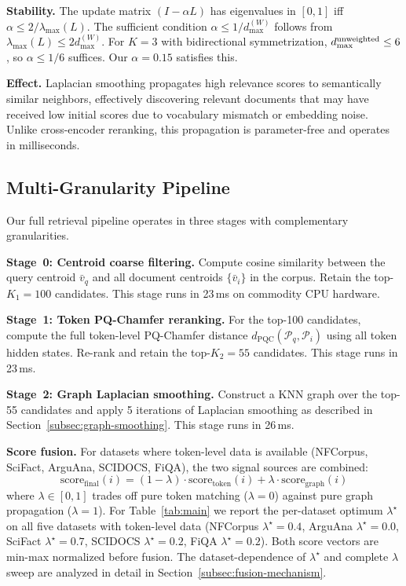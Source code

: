 \documentclass[review,1p]{elsarticle}
\newcommand{\bv}{\bar{v}}
\begin{document}
\textbf{Stability.} The update matrix $(I - \alpha L)$ has eigenvalues in $[0,1]$ iff $\alpha \le 2/\lambda_{\max}(L)$. The sufficient condition $\alpha \le 1/d_{\max}^{(W)}$ follows from $\lambda_{\max}(L) \le 2 d_{\max}^{(W)}$. For $K=3$ with bidirectional symmetrization, $d_{\max}^{\rm unweighted} \le 6$, so $\alpha \le 1/6$ suffices. Our $\alpha = 0.15$ satisfies this.

\textbf{Effect.} Laplacian smoothing propagates high relevance scores to semantically similar neighbors, effectively discovering relevant documents that may have received low initial scores due to vocabulary mismatch or embedding noise. Unlike cross-encoder reranking, this propagation is parameter-free and operates in milliseconds.

\subsection{Multi-Granularity Pipeline}
\label{subsec:pipeline}

Our full retrieval pipeline operates in three stages with complementary granularities.

\textbf{Stage~0: Centroid coarse filtering.} Compute cosine similarity between the query centroid $\bv_q$ and all document centroids $\{\bv_i\}$ in the corpus. Retain the top-$K_1 = 100$ candidates. This stage runs in 23\,ms on commodity CPU hardware.

\textbf{Stage~1: Token PQ-Chamfer reranking.} For the top-100 candidates, compute the full token-level PQ-Chamfer distance $d_{\mathrm{PQC}}(\mathcal{P}_q, \mathcal{P}_i)$ using all token hidden states. Re-rank and retain the top-$K_2 = 55$ candidates. This stage runs in 23\,ms.

\textbf{Stage~2: Graph Laplacian smoothing.} Construct a KNN graph over the top-55 candidates and apply 5 iterations of Laplacian smoothing as described in Section~\ref{subsec:graph-smoothing}. This stage runs in 26\,ms.

\textbf{Score fusion.} For datasets where token-level data is available (NFCorpus, SciFact, ArguAna, SCIDOCS, FiQA), the two signal sources are combined:
\begin{equation}
\label{eq:fusion}
\text{score}_{\text{final}}(i) = (1 - \lambda) \cdot \text{score}_{\text{token}}(i) + \lambda \cdot \text{score}_{\text{graph}}(i)
\end{equation}
where $\lambda \in [0,1]$ trades off pure token matching ($\lambda=0$) against pure graph propagation ($\lambda=1$). For Table~\ref{tab:main} we report the per-dataset optimum $\lambda^\star$ on all five datasets with token-level data (NFCorpus $\lambda^\star=0.4$, ArguAna $\lambda^\star=0.0$, SciFact $\lambda^\star=0.7$, SCIDOCS $\lambda^\star=0.2$, FiQA $\lambda^\star=0.2$). Both score vectors are min-max normalized before fusion. The dataset-dependence of $\lambda^\star$ and complete $\lambda$ sweep are analyzed in detail in Section~\ref{subsec:fusion-mechanism}.
\end{document}
